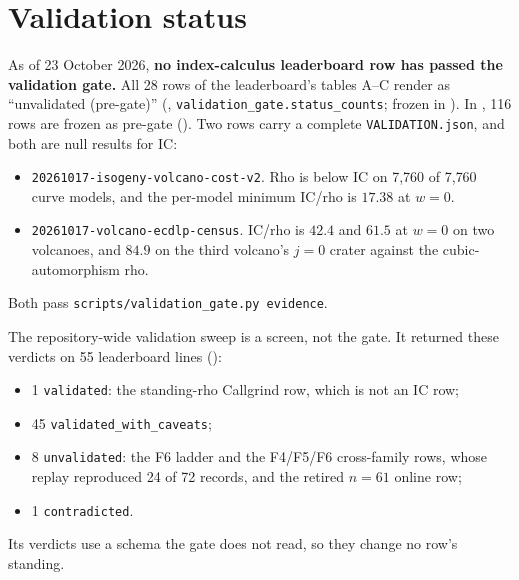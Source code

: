 \section{Validation status}\label{sec:gate}

As of 23 October 2026, \textbf{no index-calculus leaderboard row has passed
the validation gate.} All 28 rows of the leaderboard's tables A--C render as
``unvalidated (pre-gate)''
(, \texttt{validation\_gate.status\_counts};
frozen in ). In
, 116 rows are frozen as pre-gate
(). Two rows carry a complete
\texttt{VALIDATION.json}, and both are null results for IC:
\begin{itemize}
\item \texttt{20261017-isogeny-volcano-cost-v2}. Rho is below IC on 7{,}760
  of 7{,}760 curve models, and the per-model minimum IC/rho is $17.38$ at
  $w=0$.
\item \texttt{20261017-volcano-ecdlp-census}. IC/rho is $42.4$ and $61.5$
  at $w=0$ on two volcanoes, and $84.9$ on the third volcano's $j=0$ crater
  against the cubic-automorphism rho.
\end{itemize}
Both pass \texttt{scripts/validation\_gate.py evidence}.

The repository-wide validation sweep is a screen, not the gate. It
returned these verdicts on 55 leaderboard lines
():
\begin{itemize}
\item 1 \texttt{validated}: the standing-rho Callgrind row, which is not an
  IC row;
\item 45 \texttt{validated\_with\_caveats};
\item 8 \texttt{unvalidated}: the F6 ladder and the F4/F5/F6
  cross-family rows, whose replay reproduced 24 of 72 records, and the
  retired $n=61$ online row;
\item 1 \texttt{contradicted}.
\end{itemize}
Its verdicts use a schema the gate does not read, so they change no row's
standing.

